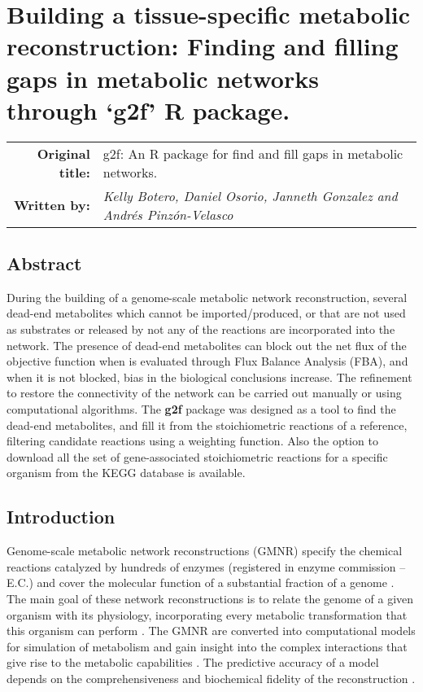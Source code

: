 \chapter{Building a tissue-specific metabolic reconstruction: Finding and filling gaps in metabolic networks through `g2f' R package.}
\begin{tabular}{rm{12.5cm}}
\textsf{\textbf{Original title:}}& g2f: An R package for find and fill gaps in metabolic networks.\\
\textsf{\textbf{Written by:}} & \textit{Kelly Botero, Daniel Osorio, Janneth Gonzalez and Andrés Pinzón-Velasco}\\ 
\end{tabular}
\section*{Abstract}
During the building of a genome-scale metabolic network reconstruction, several dead-end metabolites which cannot be imported/produced, or that are not used as substrates or released by not any of the reactions are incorporated into the network. The presence of dead-end metabolites can block out the net flux of the objective function when is evaluated through Flux Balance Analysis (FBA), and when it is not blocked, bias in the biological conclusions increase. The refinement to restore the connectivity of the network can be carried out manually or using computational algorithms. The \textbf{g2f} package was designed as a tool to find the dead-end metabolites, and fill it from the stoichiometric reactions of a reference, filtering candidate reactions using a weighting function. Also the option to download all the set of gene-associated stoichiometric reactions for a specific organism from the KEGG database is available.
\section{Introduction}
Genome-scale metabolic network reconstructions (GMNR) specify the chemical reactions catalyzed by hundreds of enzymes (registered in enzyme commission – E.C.) and cover the molecular function of a substantial fraction of a genome \cite{szappanos2011integrated}. The main goal of these network reconstructions is to relate the genome of a given organism with its physiology, incorporating every metabolic transformation that this organism can perform \cite{chen2012metabolic,agren2013raven}. The GMNR are converted into computational models for simulation of metabolism and gain insight into the complex interactions that give rise to the metabolic capabilities \cite{alper2005identifying,fong2005silico}. The predictive accuracy of a model depends on the comprehensiveness and biochemical fidelity of the reconstruction \cite{Thiele2014}. \\

